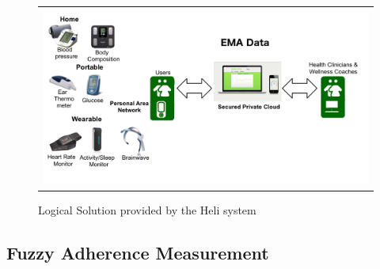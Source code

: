 \documentclass{llncs}
\begin{document}
\begin{figure}
  \begin{center}
  \begin{tabular}{c}
    \includegraphics[scale=0.5]{LogicalSolutionNow.png}\\
    \end{tabular}
    \caption{Logical Solution provided by the Heli system\cite{rem2012}}
     \label{Fig.heli}
\end{center}
\end{figure} 

\subsection{Fuzzy  Adherence Measurement}
\end{document}
